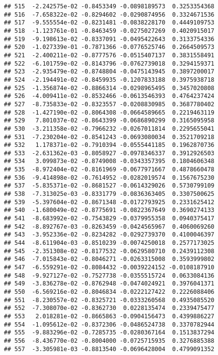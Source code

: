 \documentclass[
]{article}
\begin{document}
\begin{verbatim}
## 515  -2.242575e-02 -0.8453349 -0.0898189573  0.3253354368
## 516  -7.658322e-02 -0.8294602 -0.0290874956  0.3324671536
## 517  -9.555554e-02 -0.8231481 -0.0838228170  0.4449109753
## 518  -1.123761e-01 -0.8463459 -0.0275027269  0.4020915017
## 519  -9.198613e-02 -0.8337091 -0.0495422643  0.3133754336
## 520  -1.027339e-01 -0.7871366 -0.0776525746  0.2664509573
## 521  -2.400211e-02 -0.8777576 -0.0515407137  0.3831558491
## 522  -6.101759e-02 -0.8143796 -0.0762739018  0.3294159371
## 523  -2.935479e-02 -0.8748804 -0.0475143945  0.3897200017
## 524  -2.194491e-02 -0.8459935 -0.1207833188  0.3975938718
## 525  -1.356874e-02 -0.8866314 -0.0298965495  0.3457020808
## 526  -4.009411e-02 -0.8532466 -0.0613546393  0.4764237424
## 527  -8.735833e-02 -0.8323557 -0.0208830985  0.3687780402
## 528  -1.427190e-02 -0.8064308 -0.0664589665  0.2219463119
## 529   7.801037e-02 -0.8643399 -0.0686890299  0.3165095958
## 530  -3.211358e-02 -0.7966232 -0.0267011814  0.2295655041
## 531  -7.230204e-02 -0.8541243 -0.0693080034  0.3521709218
## 532   1.178371e-02 -0.7910394 -0.0555441185  0.1962870736
## 533  -2.631362e-03 -0.8058927 -0.0978346337  0.3912926503
## 534   3.099873e-02 -0.8749008 -0.0343357395  0.1804606348
## 535  -8.972404e-02 -0.8161969 -0.0677971667  0.4878660478
## 536  -9.414898e-02 -0.7614952 -0.0282019574  0.1567675230
## 537  -5.835371e-02 -0.8681527 -0.0614329026  0.5730799109
## 538  -7.313025e-03 -0.8331779 -0.0836363405  0.3307500625
## 539  -5.397604e-02 -0.8671348 -0.0172793925  0.2331625412
## 540  -1.680049e-02 -0.8775691 -0.0822367649  0.3690274133
## 541  -8.683992e-02 -0.7543829 -0.0379955358  0.0940375417
## 542  -8.892767e-03 -0.8263459 -0.0424565967  0.4060069260
## 543  -3.952336e-02 -0.8234282 -0.0292739370  0.4100046397
## 544  -8.611904e-03 -0.8510239 -0.0074250018  0.2577173025
## 545  -2.351308e-02 -0.8177532 -0.0629580710  0.2439112308
## 546  -7.015843e-02 -0.8046271 -0.0263315008  0.3593999802
## 547  -6.559291e-02 -0.8084432 -0.0039224152 -0.0108187910
## 548  -9.927127e-02 -0.7527738 -0.0355515724  0.0633084136
## 549  -3.836278e-02 -0.8762948 -0.0474024921  0.3976041371
## 550  -6.569216e-02 -0.8046834 -0.0222127422  0.2226088406
## 551  -8.230557e-02 -0.8325721 -0.0333260568  0.4935085520
## 552  -7.308070e-02 -0.8362730  0.0228135474  0.2339475477
## 553   2.018281e-02 -0.8665863 -0.0904156473  0.4399886227
## 554  -1.095612e-02 -0.8372306 -0.0486524738  0.3370782944
## 555  -9.883296e-02 -0.7285735 -0.0280367164  0.1513837294
## 556  -8.436770e-02 -0.8004000 -0.0725715935  0.3276885388
## 557  -3.305981e-03 -0.8813540 -0.0696428004  0.4799091352

\end{verbatim}
\end{document}

